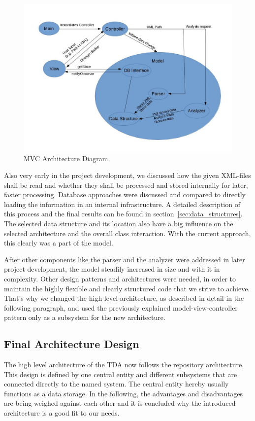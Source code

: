 \begin{figure}
\begin{center}
\includegraphics[scale=0.35]{pics/Architecture_diagram.jpg}
\caption{MVC Architecture Diagram}
\label{MVCdiagram}
\end{center}
\end{figure}

Also very early in the project development, we discussed how the given XML-files shall be read and whether they shall be processed and stored internally for later, faster processing. Database approaches were discussed and compared to directly loading the information in an internal infrastructure. A detailed description of this process and the final results can be found in section~\ref{sec:data_structures}.
The selected data structure and its location also have a big influence on the selected architecture and the overall class interaction. With the current approach, this clearly was a part of the model.

After other components like the parser and the analyzer were addressed in later project development, the model steadily increased in size and with it in complexity. Other design patterns and architectures were needed, in order to maintain the highly flexible and clearly structured code that we strive to achieve. That's why we changed the high-level architecture, as described in detail in the following paragraph, and used the previously explained model-view-controller pattern only as a subsystem for the new architecture.


\subsection{Final Architecture Design}
The high level architecture of the TDA now follows the repository architecture. This design is defined by one central entity and different subsystems that are connected directly to the named system. The central entity hereby usually functions as a data storage. In the following, the advantages and disadvantages are being weighed against each other and it is concluded why the introduced architecture is a good fit to our needs.

